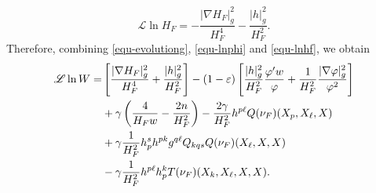 \documentclass[10pt,a4paper]{amsart}
\numberwithin{equation}{section}
\begin{document}
		\begin{equation}
			\mathscr{L} \ln H_F = -\dfrac{|\nabla H_F|^2_{g}}{H_F^4} - \dfrac{|h|_{g}^2}{H_F^2}.
			\label{equ-lnhf}
		\end{equation}
		Therefore, combining \eqref{equ-evolutiong}, \eqref{equ-lnphi} and \eqref{equ-lnhf}, we obtain
		\begin{align}
			\mathscr{L} \ln W =& \left[ \dfrac{|\nabla H_F|^2_{g}}{H_F^4}+\dfrac{|h|_{g}^2}{H_F^2} \right] - (1-\varepsilon) \left[ \dfrac{|h|_{g}^2}{H_F^2}\dfrac{\varphi' w}{\varphi} + \dfrac{1}{H_F^2}\dfrac{|\nabla\varphi|^2_{g}}{\varphi^2}  \right] \notag\\
			&+\gamma\left( \dfrac{4}{H_F w}-\dfrac{2n}{H_F^2} \right) - \dfrac{2\gamma}{H_F^2}h^{p\ell}Q(\nu_F)(X_p,X_{\ell},X)\notag\\
			&+ \gamma\dfrac{1}{H_F^2}h^s_ph^{pk}g^{q\ell}Q_{kqs}Q(\nu_F)(X_{\ell},X,X)\nonumber\\
			&- \gamma\dfrac{1}{H_F^2} h^{p\ell}h^k_p T(\nu_F)(X_k,X_{\ell},X,X).  \label{equ-lnw}
		\end{align}
		
\end{document}
